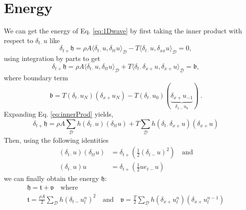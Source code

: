 \documentclass[dvipsnames]{article}
\begin{document}
\section{Energy}
We can get the energy of Eq. \eqref{eq:1Dwave} by first taking the inner product with respect to $\delta_{t\cdot}u$ like
\begin{equation}
    \delta_{t+}\mathfrak{h} = \rho A\langle \delta_{t\cdot}u, \delta_{tt}u\rangle_\mathcal{D} - T \langle \delta_{t\cdot}u,\delta_{xx}u\rangle_\mathcal{D} = 0,
\end{equation}
using integration by parts to get
\begin{equation}\label{eq:innerProd}
    \delta_{t+}\mathfrak{h} = \rho A\langle \delta_{t\cdot}u, \delta_{tt}u\rangle_\mathcal{D} + T \langle \delta_{t\cdot}\delta_{x+}u,\delta_{x+}u\rangle_{\underline{\mathcal{D}}} = \mathfrak{b},
\end{equation}
where boundary term
\begin{equation}
    \mathfrak{b} = T (\delta_{t\cdot}u_N)(\delta_{x+}u_N) - T(\delta_{t\cdot}u_0)(\underbrace{\delta_{x+}u_{-1}}_{\delta_{x-}u_0})\ .
\end{equation}
Expanding Eq. \eqref{eq:innerProd} yields,
\begin{equation}
    \delta_{t+}\mathfrak{h} = \rho A \sum_\mathcal{D}h(\delta_{t\cdot}u)(\delta_{tt}u) + T \sum_{\underline{\mathcal{D}}}h(\delta_{t\cdot}\delta_{x+}u)(\delta_{x+}u)
\end{equation}
Then, using the following identities  
\begin{subequations}
\begin{align}
    (\delta_{t\cdot}u)(\delta_{tt}u) &= \delta_{t+}\left(\frac{1}{2}(\delta_{t-}u)^2\right) \quad \text{and}\label{eq:identity1}\\
    (\delta_{t\cdot}u)u &= \delta_{t+}\left(\frac{1}{2}u e_{t-}u\right)\label{eq:identity2}
\end{align}
\end{subequations}
we can finally obtain the energy $\mathfrak{h}$:
\begin{gather}
        \mathfrak{h} = \mathfrak{t} + \mathfrak{v}\quad \text{where}\\
    \mathfrak{t} = \frac{\rho A}{2} \sum_{\mathcal{D}} h (\delta_{t-}u_l^n)^2 \quad \text{and} \quad \mathfrak{v} =  \frac{T}{2}\sum_{\underline{\mathcal{D}}}h (\delta_{x+}u_l^n)(\delta_{x+}u_l^{n-1})\nonumber
\end{gather}
\end{document}
